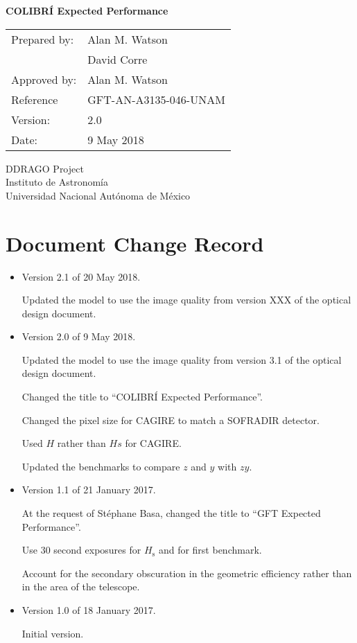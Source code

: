 \documentclass{article}
\newcommand{\Hs}{\mbox{$H_\mathrm{s}$}}
\begin{document}
\pagestyle{empty}

\begin{center}
\Large \bfseries 
COLIBRÍ Expected Performance
\end{center}

\begin{center}
\begin{tabular}{ll}
Prepared by:&Alan M. Watson\\
&David Corre\\
Approved by:&Alan M. Watson\\
Reference&GFT-AN-A3135-046-UNAM\\
Version:& 2.0\\
Date:&9 May 2018\\
\end{tabular}
\end{center}

\vspace{\fill}

\begin{center}
DDRAGO Project\\
Instituto de Astronomí­a\\
Universidad Nacional Autónoma de México
\end{center}

\newpage
\section*{Document Change Record}

\begin{itemize}
\item Version 2.1 of 20 May 2018.

Updated the model to use the image quality from version XXX of the optical design document.

\item Version 2.0 of 9 May 2018.

Updated the model to use the image quality from version 3.1 of the optical design document.

Changed the title to “COLIBRÍ Expected Performance”.

Changed the pixel size for CAGIRE to match a SOFRADIR detector.

Used $H$ rather than $Hs$ for CAGIRE.

Updated the benchmarks to compare $z$ and $y$ with $zy$.

\item Version 1.1 of 21 January 2017.

At the request of Stéphane Basa, changed the title to “GFT Expected Performance”.

Use 30 second exposures for $\Hs$ and for first benchmark.

Account for the secondary obscuration in the geometric efficiency rather than in the area of the telescope.

\item Version 1.0 of 18 January 2017.

Initial version.
\end{itemize}
\end{document}
